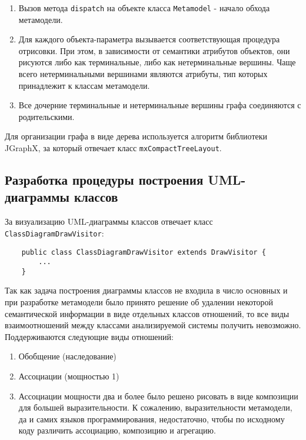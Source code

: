 \begin{enumerate}
    \item Вызов метода \texttt{dispatch} на объекте класса \texttt{Metamodel} -
    начало обхода метамодели.
    \item Для каждого объекта-параметра вызывается соответствующая процедура
    отрисовки. При этом, в зависимости от семантики атрибутов объектов, они
    рисуются либо как терминальные, либо как нетерминальные вершины. Чаще всего
    нетерминальными вершинами являются атрибуты, тип которых принадлежит к
    классам метамодели.
    \item Все дочерние терминальные и нетерминальные вершины графа соединяются с
    родительскими.
\end{enumerate}

Для организации графа в виде дерева используется алгоритм библиотеки JGraphX, за
который отвечает класс \texttt{mxCompactTreeLayout}.

\subsection{Разработка процедуры построения UML-диаграммы классов}

За визуализацию UML-диаграммы классов отвечает класс
\texttt{ClassDiagramDrawVisitor}:

\begin{lstlisting}
    public class ClassDiagramDrawVisitor extends DrawVisitor {
        ...
    }
\end{lstlisting}

Так как задача построения диаграммы классов не входила в число основных и при
разработке метамодели было принято решение об удалении некоторой семантической
информации в виде отдельных классов отношений, то все виды взаимоотношений между
классами анализируемой системы получить невозможно. Поддерживаются следующие
виды отношений:

\begin{enumerate}
    \item Обобщение (наследование)
    \item Ассоциации (мощностью 1)
    \item Ассоциации мощности два и более было решено рисовать в виде композиции
    для большей выразительности. К сожалению, выразительности метамодели, да и
    самих языков программирования, недостаточно, чтобы по исходному коду
    различить ассоциацию, композицию и агрегацию.
\end{enumerate}

